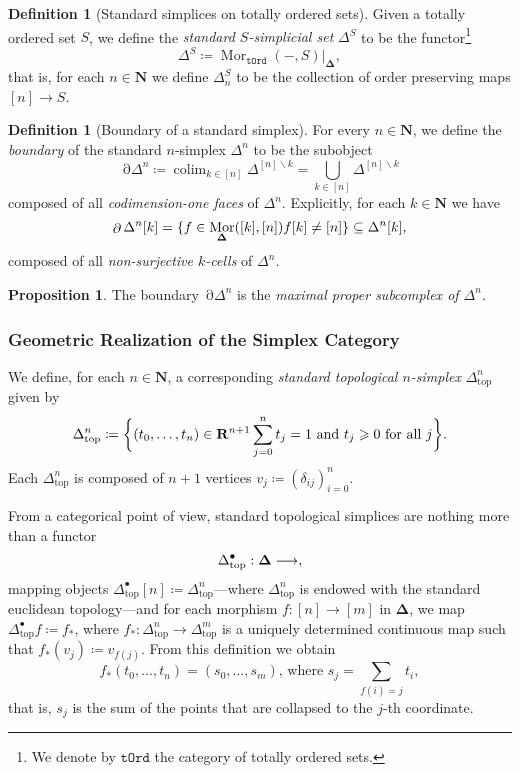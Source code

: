 \documentclass[11pt, reqno]{amsart}
\theoremstyle{definition}
\newtheorem{proposition}[theorem]{Proposition}
\newtheorem{definition}[theorem]{Definition}
\renewcommand{\geq}{\geqslant}
\renewcommand{\setminus}{\smallsetminus}
\let\colon\relax
\DeclareMathOperator{\Colim}{colim} %
\newcommand{\N}{\mathbf{N}}
\newcommand{\R}{\mathbf{R}}
\newcommand{\catfont}{\texttt}
\newcommand{\tOrd}{{\catfont{tOrd}}}        %
\DeclareMathOperator{\Hom}{Mor}   %
\let\Top\relax
\newcommand{\Top}{{\catfont{Top}}}                       %
\newcommand{\Splx}{{\mathbf{\Delta}}}           %
\newcommand{\splx}{\Delta}
\newcommand{\splxtop}{\Delta_{\text{top}}}
\DeclareMathOperator{\Bd}{\partial} %
\begin{document}
\begin{definition}[Standard simplices on totally ordered sets]
\label{def:standard-simplex-on-totally-ordered-set}
Given a totally ordered set \(S\), we define the \emph{standard \(S\)-simplicial
set} \(\splx^S\) to be the functor\footnote{We denote by \(\tOrd\) the category
of totally ordered sets.}
\[
\splx^{S} \coloneq \Hom_{\tOrd}(-, S)|_{\Splx},
\]
that is, for each \(n \in \N\) we define \(\splx^S_n\) to be the collection of
order preserving maps \([n] \to S\).
\end{definition}

\begin{definition}[Boundary of a standard simplex]
\label{def:boundary-of-standard-simplex}
For every \(n \in \N\), we define the \emph{boundary} of the standard
\(n\)-simplex \(\splx^n\) to be the subobject
\[
\Bd \splx^n \coloneq \Colim_{k \in [n]} \splx^{[n] \setminus k}
= \bigcup_{k \in [n]} \splx^{[n] \setminus k}
\]
composed of all \emph{codimension-one faces} of \(\splx^n\). Explicitly, for
each \(k \in \N\) we have
\[
\Bd \splx^n [k] = \{ f \in \Hom_{\Splx}([k], [n]) \colon f[k] \neq [n] \}
\subseteq \splx^n[k],
\]
composed of all \emph{non-surjective \(k\)-cells} of \(\splx^n\).
\end{definition}

\begin{proposition}
\label{prop:boundary-maximal-proper-subcomplex}
The boundary \(\Bd \splx^n\) is the \emph{maximal proper subcomplex of
  \(\splx^n\)}.
\end{proposition}

\subsubsection{Geometric Realization of the Simplex Category}

We define, for each \(n \in \N\), a corresponding \emph{standard topological
  \(n\)-simplex} \(\splxtop^n\) given by
\[
\splxtop^n \coloneq \bigg\{(t_0, \dots, t_n) \in \R^{n+1} \colon \sum_{j=0}^n
t_j = 1 \text{ and } t_j \geq 0 \text{ for all } j \bigg\}.
\]
Each \(\splxtop^n\) is composed of \(n+1\) vertices
\(v_j \coloneq (\delta_{ij})_{i=0}^n\).

From a categorical point of view, standard topological simplices are nothing
more than a functor
\[
\splxtop^{\bullet}: \Splx \longrightarrow \Top,
\]
mapping objects \(\splxtop^{\bullet}[n] \coloneq \splxtop^n\)---where
\(\splxtop^n\) is endowed with the standard euclidean topology---and for each
morphism \(f: [n] \to [m]\) in \(\Splx\), we map
\(\splxtop^{\bullet} f \coloneq f_{*}\), where
\(f_{*}: \splxtop^n \to \splxtop^m\) is a uniquely determined continuous map
such that \(f_{*}(v_j) \coloneq v_{f(j)}\). From this definition we obtain
\[
f_{*}(t_0, \dots, t_n) = (s_0, \dots, s_m) \text{,\ \ where \ }
s_j = \sum_{f(i) = j} t_i,
\]
that is, \(s_j\) is the sum of the points that are collapsed to the \(j\)-th
coordinate.
\end{document}
